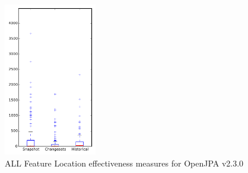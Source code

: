 
\begin{figure}[t]
\centering
\includegraphics[width=0.36\textwidth]{figures/flt/all_openjpa}
\caption{ALL Feature Location effectiveness measures for OpenJPA v2.3.0}
\label{fig:flt:all:openjpa}
\end{figure}
